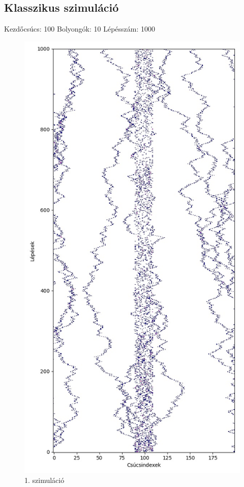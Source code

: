 \documentclass[14pt,a4paper]{article}
\begin{document}
\subsection{Klasszikus szimuláció}
Kezdőcsúcs: 100
Bolyongók: 10
Lépésszám: 1000
\begin{figure}[H]
\centering
\includegraphics[width = 0.7\columnwidth]{sim01.jpg}
\caption{1. szimuláció}
\end{figure}
\end{document}
